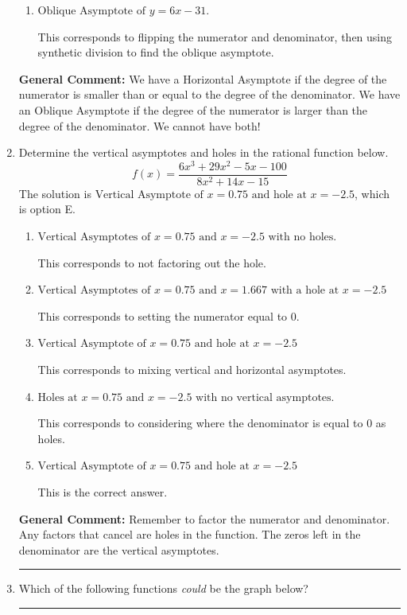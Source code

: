 \documentclass{extbook}[14pt]
\newcommand{\litem}[1]{\item #1

\rule{\textwidth}{0.4pt}}
\begin{document}
\begin{enumerate}
{\begin{enumerate}[label=\Alph*.]
This corresponds to using rule for Horizontal Asymptote when degree of numerator and denominator match.
\item \( \text{Oblique Asymptote of } y = 6x -31. \)

This corresponds to flipping the numerator and denominator, then using synthetic division to find the oblique asymptote.
\end{enumerate}

\textbf{General Comment:} We have a Horizontal Asymptote if the degree of the numerator is smaller than or equal to the degree of the denominator. We have an Oblique Asymptote if the degree of the numerator is larger than the degree of the denominator. We cannot have both!
}
\litem{
Determine the vertical asymptotes and holes in the rational function below.
\[ f(x) = \frac{6x^{3} +29 x^{2} -5 x -100}{8x^{2} +14 x -15} \]The solution is \( \text{Vertical Asymptote of } x = 0.75 \text{ and hole at } x = -2.5 \), which is option E.\begin{enumerate}[label=\Alph*.]
\item \( \text{Vertical Asymptotes of } x = 0.75 \text{ and } x = -2.5 \text{ with no holes.} \)

This corresponds to not factoring out the hole.
\item \( \text{Vertical Asymptotes of } x = 0.75 \text{ and } x = 1.667 \text{ with a hole at } x = -2.5 \)

This corresponds to setting the numerator equal to 0.
\item \( \text{Vertical Asymptote of } x = 0.75 \text{ and hole at } x = -2.5 \)

This corresponds to mixing vertical and horizontal asymptotes.
\item \( \text{Holes at } x = 0.75 \text{ and } x = -2.5 \text{ with no vertical asymptotes.} \)

This corresponds to considering where the denominator is equal to 0 as holes.
\item \( \text{Vertical Asymptote of } x = 0.75 \text{ and hole at } x = -2.5 \)

This is the correct answer.
\end{enumerate}

\textbf{General Comment:} Remember to factor the numerator and denominator. Any factors that cancel are holes in the function. The zeros left in the denominator are the vertical asymptotes.
}
\litem{
Which of the following functions \textit{could} be the graph below?

}
\end{enumerate}
\end{document}
